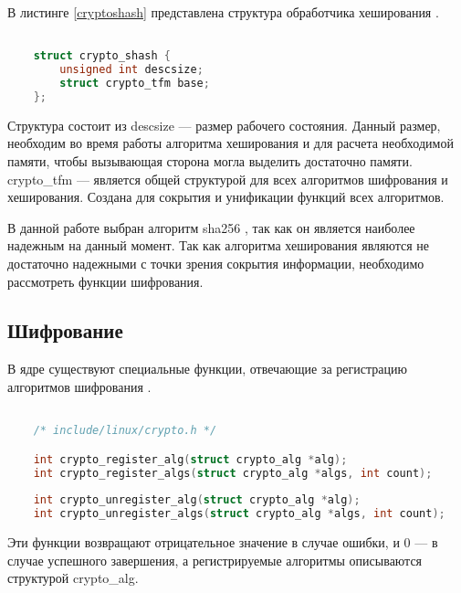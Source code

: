 В листинге \ref{cryptoshash} представлена структура обработчика хеширования \cite{structhasg}.

\begin{lstlisting}[language=c, label=cryptoshash, caption=Структура обработчика хеширования.]

    struct crypto_shash {
        unsigned int descsize; 
        struct crypto_tfm base;
    };

\end{lstlisting}

Структура состоит из descsize --- размер рабочего состояния.
Данный размер, необходим во время работы алгоритма хеширования и для расчета необходимой памяти, чтобы вызывающая сторона могла выделить достаточно памяти.
crypto\_tfm --- является общей структурой для всех алгоритмов шифрования и хеширования.
Создана для сокрытия и унификации функций всех алгоритмов.

В данной работе выбран алгоритм sha256 \cite{sha256}, так как он является наиболее надежным на данный момент.
Так как алгоритма хеширования являются не достаточно надежными с точки зрения сокрытия информации, необходимо рассмотреть функции шифрования.

\subsection{Шифрование}

В ядре существуют специальные функции, отвечающие за регистрацию алгоритмов шифрования \cite{cipher}.

\begin{lstlisting}[language=c, label=some-code, caption=Регистрация алгоритмов шифрования.]

    /* include/linux/crypto.h */

    int crypto_register_alg(struct crypto_alg *alg);
    int crypto_register_algs(struct crypto_alg *algs, int count);
    
    int crypto_unregister_alg(struct crypto_alg *alg);
    int crypto_unregister_algs(struct crypto_alg *algs, int count);

\end{lstlisting}

Эти функции возвращают отрицательное значение в случае ошибки, и 0 --- в случае успешного завершения,
а регистрируемые алгоритмы описываются структурой crypto\_alg.


